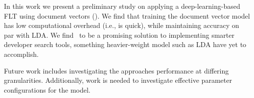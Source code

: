 
%



In this work we present a preliminary study on applying a deep-learning-based
FLT using document vectors (\dv). We find that training the document vector
model has low computational overhead (i.e., is quick), while maintaining
accuracy on par with LDA. We find \dv\ to be a promising solution to implementing
smarter developer search tools, something heavier-weight model such as LDA have
yet to accomplish.

Future work includes investigating the approaches performance at differing granularities.
Additionally, work is needed to investigate effective parameter configurations for the model.
